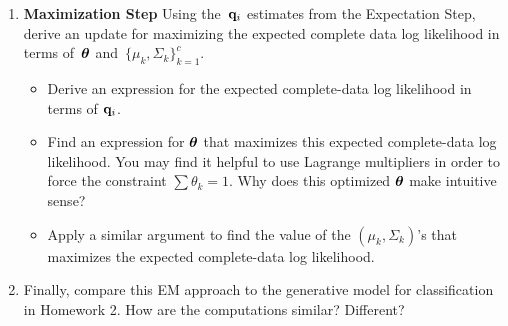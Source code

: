 \documentclass[submit]{harvardml}
\begin{document}
\begin{problem}
\begin{enumerate}
\begin{itemize}
\end{itemize}

\item \textbf{Maximization Step}
    Using the~$\mathbf{q}_i$ estimates from the Expectation Step, derive an update
    for maximizing the expected complete data log likelihood in terms
    of~$\boldsymbol{\theta}$ and~$\{ \mu_k,\Sigma_k \}^c_{k=1}$.

\begin{itemize}
    \item Derive an expression for the expected complete-data log likelihood in
        terms of $\mathbf{q}_i$.
    \item Find an expression for $\boldsymbol{\theta}$ that maximizes this expected
        complete-data log likelihood. You may find it helpful to use Lagrange
        multipliers in order to force the constraint $\sum \theta_k = 1$. Why
        does this optimized $\boldsymbol{\theta}$ make intuitive sense?
    \item Apply a similar argument to find the value of the
        $(\mu_k,\Sigma_k)$'s that maximizes the expected complete-data log
        likelihood.
\end{itemize}

\item Finally, compare this EM approach to the generative model for
    classification in Homework 2.  How are the computations similar?
    Different?

\end{enumerate}

\end{problem}
\end{document}
